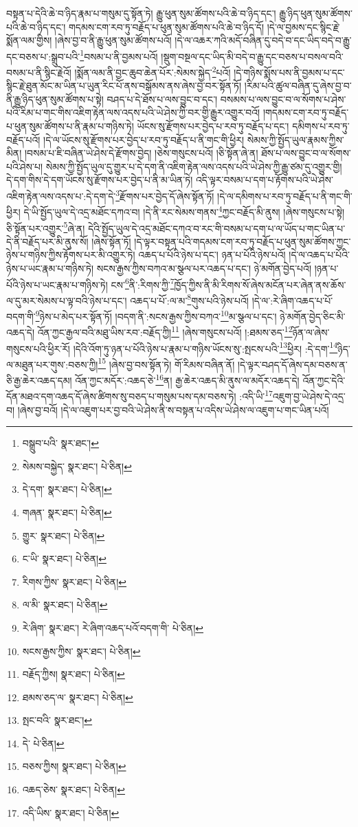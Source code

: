 བསྟན་པ་དེའི་ཆེ་བ་ཉིད་རྣམ་པ་གསུམ་དུ་སྟོན་ཏེ། རྒྱུ་ཕུན་སུམ་ཚོགས་པའི་ཆེ་བ་ཉིད་དང་། རྒྱུ་ཉིད་ཕུན་སུམ་ཚོགས་པའི་ཆེ་བ་ཉིད་དང་། གདམས་ངག་རབ་ཏུ་བརྗོད་པ་ཕུན་སུམ་ཚོགས་པའི་ཆེ་བ་ཉིད་དོ། །དེ་ལ་བྱམས་དང་སྙིང་རྗེ་སྨོན་ལམ་གྱིས། །ཞེས་བྱ་བ་ནི་རྒྱུ་ཕུན་སུམ་ཚོགས་པའོ། །དེ་ལ་འཆར་ཀའི་མདོ་བཞིན་དུ་བདེ་བ་དང་ཡིད་བདེ་བ་རྒྱུ་དང་བཅས་པ་:སྒྲུབ་པའི་\footnote{བསྒྲུབ་པའི་  སྣར་ཐང་། }བསམ་པ་ནི་བྱམས་པའོ། །སྡུག་བསྔལ་དང་ཡིད་མི་བདེ་བ་རྒྱུ་དང་བཅས་པ་བསལ་བའི་བསམ་པ་ནི་སྙིང་རྗེའོ། །སྨོན་ལམ་ནི་བྱང་ཆུབ་ཆེན་པོར་:སེམས་སྐྱེད་\footnote{སེམས་བསྐྱེད་  སྣར་ཐང་།  པེ་ཅིན། }པའོ། །དེ་གཉིས་སྨོས་པས་ནི་བྱམས་པ་དང་སྙིང་རྗེ་ཐུན་མོང་མ་ཡིན་པ་ཡུན་རིང་པོ་ནས་བསྒོམས་ནས་ཞེས་བྱ་བར་སྟོན་ཏོ། །རིམ་པའི་ཚུལ་བཞིན་དུ་ཞེས་བྱ་བ་ནི་རྒྱུ་ཉིད་ཕུན་སུམ་ཚོགས་པ་སྟེ། བཤད་པ་དེ་ཐོས་པ་ལས་བྱུང་བ་དང་། བསམས་པ་ལས་བྱུང་བ་ལ་སོགས་པ་ཤེས་པའི་རིམ་པ་གང་གིས་འཇིག་རྟེན་ལས་འདས་པའི་ཡེ་ཤེས་ཀྱི་བར་གྱི་རྒྱུར་འགྱུར་བའོ། །གདམས་ངག་རབ་ཏུ་བརྗོད་པ་ཕུན་སུམ་ཚོགས་པ་ནི་རྣམ་པ་གཉིས་ཏེ། ཡོངས་སུ་རྫོགས་པར་བྱེད་པ་རབ་ཏུ་བརྗོད་པ་དང་། དམིགས་པ་རབ་ཏུ་བརྗོད་པའོ། །དེ་ལ་ཡོངས་སུ་རྫོགས་པར་བྱེད་པ་རབ་ཏུ་བརྗོད་པ་ནི་གང་གི་ཕྱིར། སེམས་ཀྱི་སྤྱོད་ཡུལ་རྣམས་ཀྱིས་མིན། །བསམ་པ་ཇི་བཞིན་ཡེ་ཤེས་དེ་རྫོགས་བྱེད། །ཅེས་གསུངས་པའོ། །ཅི་སྟོན་ཞེ་ན། ཐོས་པ་ལས་བྱུང་བ་ལ་སོགས་པའི་ཤེས་པ། སེམས་ཀྱི་སྤྱོད་ཡུལ་དུ་གྱུར་པ་དེ་དག་ནི་འཇིག་རྟེན་ལས་འདས་པའི་ཡེ་ཤེས་ཀྱི་རྒྱུ་ཙམ་དུ་འགྱུར་གྱི། དེ་དག་གིས་དེ་དག་ཡོངས་སུ་རྫོགས་པར་བྱེད་པ་ནི་མ་ཡིན་ཏེ། འདི་ལྟར་བསམ་པ་དག་པ་རྟོགས་པའི་ཡེ་ཤེས་འཇིག་རྟེན་ལས་འདས་པ་:དེ་དག་དེ་\footnote{དེ་དག་  སྣར་ཐང་།  པེ་ཅིན། }རྫོགས་པར་བྱེད་དོ་ཞེས་སྟོན་ཏོ། །དེ་ལ་དམིགས་པ་རབ་ཏུ་བརྗོད་པ་ནི་གང་གི་ཕྱིར། དེ་ཡི་སྤྱོད་ཡུལ་དེ་འདྲ་མཐོང་དཀའ་བ། །དེ་ནི་རང་སེམས་གནས་\footnote{གཞན་  སྣར་ཐང་།  པེ་ཅིན། }ཀྱང་བརྗོད་མི་ནུས། །ཞེས་གསུངས་པ་སྟེ། ཅི་སྟོན་པར་འགྱུར་\footnote{གྱུར་  སྣར་ཐང་།  པེ་ཅིན། }ཞེ་ན། དེའི་སྤྱོད་ཡུལ་དེ་འདྲ་མཐོང་དཀའ་བ་རང་གི་བསམ་པ་དག་པ་ལ་ཡོད་པ་གང་ཡིན་པ་དེ་ནི་བརྗོད་པར་མི་ནུས་སོ། །ཞེས་སྟོན་ཏོ། །དེ་ལྟར་བསྟན་པའི་གདམས་ངག་རབ་ཏུ་བརྗོད་པ་ཕུན་སུམ་ཚོགས་ཀྱང་ཉེས་པ་གཉིས་ཀྱིས་རྟོགས་པར་མི་འགྱུར་ཏེ། འཆད་པ་པོའི་ཉེས་པ་དང་། ཉན་པ་པོའི་ཉེས་པའོ། །དེ་ལ་འཆད་པ་པོའི་ཉེས་པ་ཡང་རྣམ་པ་གཉིས་ཏེ། སངས་རྒྱས་ཀྱིས་བཀའ་མ་སྩལ་པར་འཆད་པ་དང་། ཉེ་མགོན་བྱེད་པའོ། །ཉན་པ་པོའི་ཉེས་པ་ཡང་རྣམ་པ་གཉིས་ཏེ། ངས་\footnote{ང་ཡི་  སྣར་ཐང་།  པེ་ཅིན། }ནི་:རིགས་ཀྱི་\footnote{རིགས་ཀྱིས་  སྣར་ཐང་།  པེ་ཅིན། }ཁྱོད་ཀྱིས་ནི་མི་རིགས་སོ་ཞེས་མངོན་པར་ཞེན་ནས་ཆོས་ལ་དུ་མར་སེམས་པ་ལྟ་བའི་ཉེས་པ་དང་། འཆད་པ་པོ་:ལ་མ་\footnote{ལ་མི་  སྣར་ཐང་།  པེ་ཅིན། }གུས་པའི་ཉེས་པའོ། །དེ་ལ་:རེ་ཞིག་འཆད་པ་པོ་བདག་གི་\footnote{རེ་ཞིག་  སྣར་ཐང་། རེ་ཞིག་འཆད་པའོ་བདག་གི་  པེ་ཅིན། }ཉེས་པ་མེད་པར་སྟོན་ཏོ། །བདག་ནི་:སངས་རྒྱས་ཀྱིས་བཀའ་\footnote{སངས་རྒྱས་ཀྱིས་  སྣར་ཐང་།  པེ་ཅིན། }མ་སྩལ་པ་དང་། ཉེ་མགོན་བྱེད་ཅིང་མི་འཆད་དེ། འོན་ཀྱང་རྒྱལ་བའི་མཐུ་ཡིས་རབ་:བརྗོད་ཀྱི།\footnote{བརྗོད་ཀྱིས།  སྣར་ཐང་།  པེ་ཅིན། } །ཞེས་གསུངས་པའོ། །:ཐམས་ཅད་\footnote{ཐམས་ཅད་ལ་  སྣར་ཐང་།  པེ་ཅིན། }ཉོན་ལ་ཞེས་གསུངས་པའི་ཕྱིར་རོ། །དེའི་འོག་ཏུ་ཉན་པ་པོའི་ཉེས་པ་རྣམ་པ་གཉིས་ཡོངས་སུ་:སྤངས་པའི་\footnote{སྤང་བའི་  སྣར་ཐང་། }ཕྱིར། :དེ་དག་\footnote{དེ་  པེ་ཅིན། }ཉིད་ལ་མཐུན་པར་གུས་:བཅས་ཀྱི།\footnote{བཅས་ཀྱིས།  སྣར་ཐང་།  པེ་ཅིན། } །ཞེས་བྱ་བས་སྟོན་ཏེ། གོ་རིམས་བཞིན་ནོ། །དེ་ལྟར་བཤད་དོ་ཞེས་དམ་བཅས་ན་ཅི་རྒྱ་ཆེར་འཆད་དམ། འོན་ཀྱང་མདོར་:འཆད་ཅེ་\footnote{འཆད་ཅེས་  སྣར་ཐང་།  པེ་ཅིན། }ན། རྒྱ་ཆེར་འཆད་མི་ནུས་ལ་མདོར་འཆད་དེ། འོན་ཀྱང་དེའི་དོན་མཐའ་དག་འཆད་དོ་ཞེས་ཚིགས་སུ་བཅད་པ་གསུམ་པས་དམ་བཅས་ཏེ། :འདི་ཡི་\footnote{འདི་ཡིས་  སྣར་ཐང་།  པེ་ཅིན། }འཇུག་བྱ་ཡེ་ཤེས་དེ་འདྲ་བ། །ཞེས་བྱ་བའོ། །དེ་ལ་འཇུག་པར་བྱ་བའི་ཡེ་ཤེས་ནི་ས་བསྟན་པ་འདིས་ཡེ་ཤེས་ལ་འཇུག་པ་གང་ཡིན་པའོ། 
